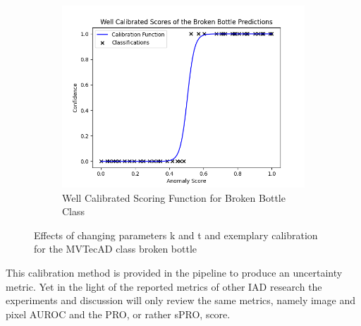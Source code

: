\begin{figure}[htbp]
\begin{subfigure}[b]{0.3\textwidth}
        \includegraphics[width=\textwidth]{figures/anomaly_calibration_soft.png}
        \caption{Well Calibrated Scoring Function for Broken Bottle Class}
        \label{fig:sub3}
    \end{subfigure}
    \caption{Effects of changing parameters k and t and exemplary calibration for the MVTecAD \cite{MVTEC_Bergmann_2021} class broken bottle}
    \label{fig:calicalibraction}
\end{figure}

This calibration method is provided in the pipeline to produce an uncertainty metric. Yet in the light of the reported metrics of other IAD research the experiments and discussion will only 
review the same metrics, namely image and pixel AUROC and the PRO, or rather sPRO, score.








